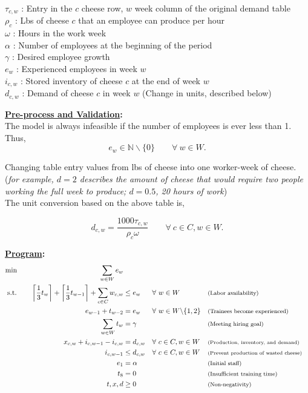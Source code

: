 \documentclass[12pt]{amsart}
\begin{document}
\noindent
\(\tau_{c,w}\) : Entry in the \(c\) cheese row, \(w\) week column of the original demand table \\
\(\rho_c\) : Lbs of cheese \(c\) that an employee can produce per hour \\
\(\omega\) : Hours in the work week \\
\(\alpha\) : Number of employees at the beginning of the period \\
\(\gamma\) : Desired employee growth \\

\noindent
\(e_w\) : Experienced employees in week \(w\) \\
\(i_{c,w}\) : Stored inventory of cheese \(c\) at the end of week \(w\) \\
\(d_{c,w}\) : Demand of cheese \(c\) in week \(w\) (Change in units, described below)

\textbf{\underline{Pre-process and Validation}:} \\

The model is always infeasible if the number of employees is ever less than 1. Thus,
\[e_w \in \mathbb N \backslash \{0\} \qquad \forall\ w\in W .\]

Changing table entry values from lbs of cheese into one worker-week of cheese. \\
(\textit{for example, \(d=2\) describes the amount of cheese that 
	would require two people working the full week to produce; \(d=0.5\),
	20 hours of work})\\
The unit conversion based on the above table is,

\[ d_{c,w} = \frac{1000\tau_{c,w}}{\rho_c \omega} \qquad \forall\ c\in C, w\in W.  \]

\textbf{\underline{Program}:} \\

\begin{align*}
	\min \hspace{27ex}   \sum_{w\in W}e_w & & & \\
	\text{s.t.} \qquad \left\lceil\frac{1}{3}t_w \right\rceil + \left\lceil\frac{1}{3}t_{w-1} \right\rceil 
	+ \sum_{c\in C}w_{c,w} &\leq e_w & &\forall\ w\in W & &\text{\footnotesize(Labor availability)} \\
	e_{w-1} + t_{w-2} &= e_w & &\forall\ w\in W\backslash\{1,2\} & &\text{\footnotesize(Trainees become experienced)} \\
	\sum_{w\in W}t_w &= \gamma && & &\text{\footnotesize(Meeting hiring goal)} \\
	x_{c,w} + i_{c,w-1} - i_{c,w} &= d_{c,w} & &\forall\ c\in C, w\in W & &\text{\scriptsize(Production, inventory, and demand)} \\
	i_{c,w-1} &\leq d_{c,w} & &\forall\ c\in C, w\in W & &\text{\scriptsize(Prevent production of wasted cheese)} \\
	e_1 &=\alpha & &\ & &\text{\footnotesize(Initial staff)} \\
	t_8 &= 0 & &\ & &\text{\footnotesize(Insufficient training time)} \\
	t,x,d &\geq0 & &\ & &\text{\footnotesize(Non-negativity)} \\
\end{align*}
\end{document}
